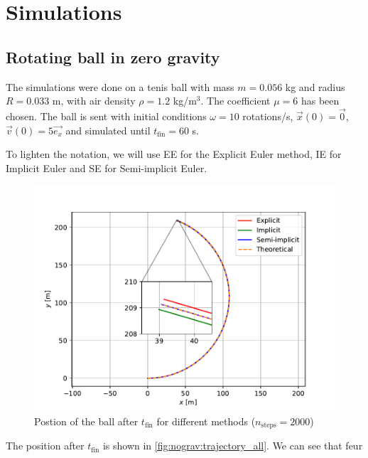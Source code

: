 \section{Simulations}

\subsection{Rotating ball in zero gravity}

The simulations were done on a tenis ball with mass $m = 0.056$ kg and radius $R = 0.033$ m, with air density $\rho = 1.2$ kg/m$^3$. The coefficient $\mu = 6$ has been chosen. The ball is sent with initial conditions $\omega = 10$ rotations/s, $\vec{x}(0) = \vec{0}$, $\vec{v}(0) = 5 \vec{e_x}$ and simulated until $t_\textrm{fin} = 60$ s.

To lighten the notation, we will use EE for the Explicit Euler method, IE for Implicit Euler and SE for Semi-implicit Euler.

\begin{figure}[h]
    \centering
    \includegraphics[width=0.8\linewidth]{figures/nograv_trajectory_all.pdf}
    \caption{Postion of the ball after $t_\textrm{fin}$ for different methods ($n_\textrm{steps} = 2000$)}
    \label{fig:nograv:trajectory_all}
\end{figure}

The position after $t_\textrm{fin}$ is shown in \autoref{fig:nograv:trajectory_all}. We can see that feur
